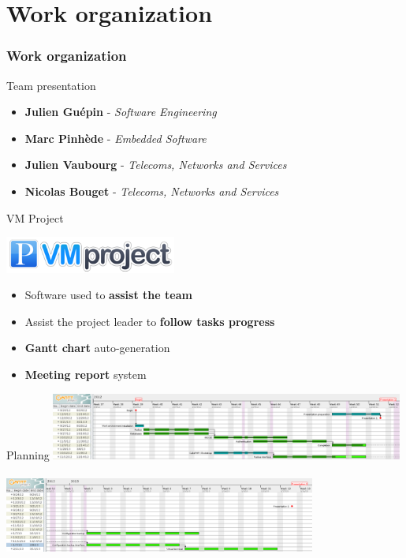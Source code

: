 \documentclass[12pt]{beamer}
\begin{document}
\part{Work organization}
\frame{\partpage}
\section{Work organization}

\begin{frame}{Team presentation}
    \begin{itemize}[<+->]
	\item {\bf Julien Guépin} - \emph{Software Engineering}
	\vfill
	\item {\bf Marc Pinhède} - \emph{Embedded Software}
	\vfill
	\item {\bf Julien Vaubourg} - \emph{Telecoms, Networks and Services}
	\vfill
	\item {\bf Nicolas Bouget} - \emph{Telecoms, Networks and Services}
    \end{itemize}
\end{frame}

\begin{frame}{VM Project}
    \begin{center}
    \includegraphics[width=160pt]{img/vmproject_logo.png}
    \end{center}
    \begin{itemize}[<+->]
	\item Software used to \textbf{assist the team}
    	\vfill
    	\item Assist the project leader to \textbf{follow tasks progress}
    	\vfill
    	\item \textbf{Gantt chart} auto-generation
    	\vfill
    	\item \textbf{Meeting report} system
    \end{itemize}
\end{frame}

\begin{frame}{Planning}
	\includegraphics[width=330pt]{img/gantt_en_part1.pdf}\\
~\\
	\includegraphics[height=70pt]{img/gantt_en_part2.pdf}
\end{frame}
\end{document}
